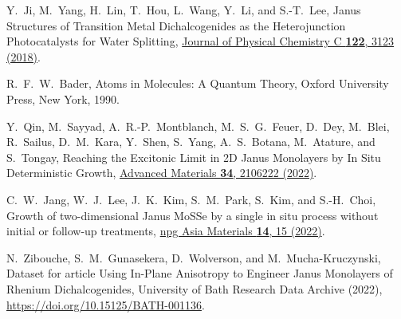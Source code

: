 \documentclass[reprint, superscriptaddress, amsmath,amssymb,prb,twocolumn]{revtex4-2}
\newcounter{bla}
\begin{document}
\begin{thebibliography}{116}
 Y.~Ji, M.~Yang, H.~Lin, T.~Hou, L.~Wang, Y.~Li, and S.-T.~Lee, Janus Structures of Transition Metal Dichalcogenides as the Heterojunction Photocatalysts for Water Splitting, \href{https://dx.doi.org/10.1021/acs.jpcc.7b11584}{Journal of Physical Chemistry C {\bf 122}, 3123 (2018)}.

 R.~F.~W.~Bader, Atoms in Molecules: A Quantum Theory, Oxford University Press, New York, 1990. %

 Y.~Qin, M.~Sayyad, A.~R.-P.~Montblanch, M.~S.~G.~Feuer, D.~Dey, M.~Blei, R.~Sailus, D.~M.~Kara, Y.~Shen, S.~Yang, A.~S.~Botana, M.~Atature, and S.~Tongay, Reaching the Excitonic Limit in 2D Janus Monolayers by In Situ Deterministic Growth, \href{https://doi.org/10.1002/adma.202106222}{Advanced Materials {\bf 34}, 2106222 (2022)}.

 C.~W.~Jang, W.~J.~Lee, J.~K.~Kim, S.~M.~Park, S.~Kim, and S.-H.~Choi, Growth of two-dimensional Janus MoSSe by a single in situ process without initial or follow-up treatments, \href{https://doi.org/10.1038/s41427-022-00363-x}{npg Asia Materials {\bf 14}, 15 (2022)}.

 N.~Zibouche, S.~M.~Gunasekera, D.~Wolverson, and M.~Mucha-Kruczynski, Dataset for article Using In-Plane Anisotropy to Engineer Janus Monolayers of Rhenium Dichalcogenides, University of Bath Research Data Archive (2022), \href{https://doi.org/10.15125/BATH-001136}{https://doi.org/10.15125/BATH-001136}.

\end{thebibliography}
\end{document}
